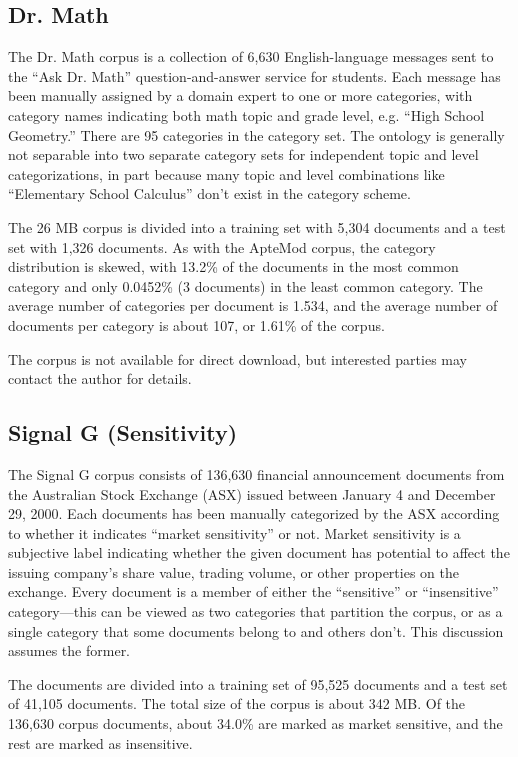 \subsection{Dr. Math}

The Dr. Math corpus is a collection of 6,630 English-language messages
sent to the ``Ask Dr. Math'' question-and-answer service for
students.\cite{drmath} Each message has been manually assigned by a
domain expert to one or more categories,
with category names indicating both math topic and grade level,
e.g. ``High School Geometry.''  There are 95 categories in the
category set.  The ontology is generally not
separable into two separate category sets for independent topic and
level categorizations, in part because many topic and level
combinations like ``Elementary School Calculus'' don't exist in the
category scheme.

The 26 MB corpus is divided into a training set with 5,304 documents
and a test set with 1,326 documents.  As with the ApteMod corpus, the
category distribution is skewed, with 13.2\% of the documents in the
most common category and only 0.0452\% (3 documents) in the least
common category.  The average number of categories per document is
1.534, and the average number of documents per category is about 107,
or 1.61\% of the corpus.

The corpus is not available for direct download, but interested
parties may contact the author for details.


\subsection{Signal G (Sensitivity)}

The Signal G corpus consists of 136,630 financial announcement
documents from the Australian Stock Exchange (ASX)\cite{asx:02} issued
between January 4 and December 29, 2000.  Each documents has been
manually categorized by the ASX according to whether it indicates ``market
sensitivity'' or not.  Market sensitivity is a subjective label indicating
whether the given document has potential to affect the issuing
company's share value, trading volume, or other properties on the
exchange.  Every document is a member of either the ``sensitive'' or
``insensitive'' category---this can be viewed as two categories that
partition the corpus, or as a single category that some documents
belong to and others don't.  This discussion assumes the former.

The documents are divided into a training set of 95,525 documents and a
test set of 41,105 documents.  The total size of the corpus is about
342 MB.  Of the 136,630 corpus documents, about 34.0\% are marked as
market sensitive, and the rest are marked as insensitive.

